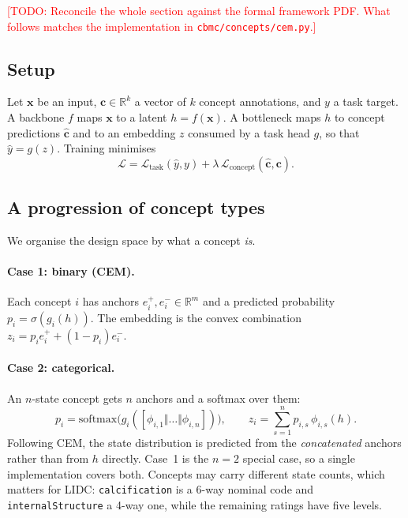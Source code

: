 \documentclass[11pt]{article}
\newcommand{\todo}[1]{\textcolor{red}{[TODO: #1]}}
\newcommand{\cvec}{\mathbf{c}}
\newcommand{\xvec}{\mathbf{x}}
\begin{document}
\todo{Reconcile the whole section against the formal framework PDF. What
follows matches the implementation in \texttt{cbmc/concepts/cem.py}.}

\subsection{Setup}
Let $\xvec$ be an input, $\cvec \in \mathbb{R}^k$ a vector of $k$ concept
annotations, and $y$ a task target. A backbone $f$ maps $\xvec$ to a latent
$h = f(\xvec)$. A bottleneck maps $h$ to concept predictions
$\hat{\cvec}$ and to an embedding $z$ consumed by a task head $g$, so that
$\hat{y} = g(z)$. Training minimises
\begin{equation}
  \mathcal{L} = \mathcal{L}_{\text{task}}(\hat{y}, y)
              + \lambda\,\mathcal{L}_{\text{concept}}(\hat{\cvec}, \cvec).
  \label{eq:loss}
\end{equation}

\subsection{A progression of concept types}
We organise the design space by what a concept \emph{is}.

\paragraph{Case 1: binary (CEM).}
Each concept $i$ has anchors $e_i^{+}, e_i^{-} \in \mathbb{R}^m$ and a predicted
probability $p_i = \sigma(g_i(h))$. The embedding is the convex combination
$z_i = p_i e_i^{+} + (1 - p_i) e_i^{-}$.

\paragraph{Case 2: categorical.}
An $n$-state concept gets $n$ anchors and a softmax over them:
\begin{equation}
  p_i = \mathrm{softmax}\big(g_i([\phi_{i,1} \Vert \dots \Vert \phi_{i,n}])\big),
  \qquad
  z_i = \sum_{s=1}^{n} p_{i,s}\, \phi_{i,s}(h).
  \label{eq:case2}
\end{equation}
Following CEM, the state distribution is predicted from the \emph{concatenated}
anchors rather than from $h$ directly. Case~1 is the $n=2$ special case, so a
single implementation covers both. Concepts may carry different state counts,
which matters for LIDC: \texttt{calcification} is a 6-way nominal code and
\texttt{internalStructure} a 4-way one, while the remaining ratings have five
levels.
\end{document}
